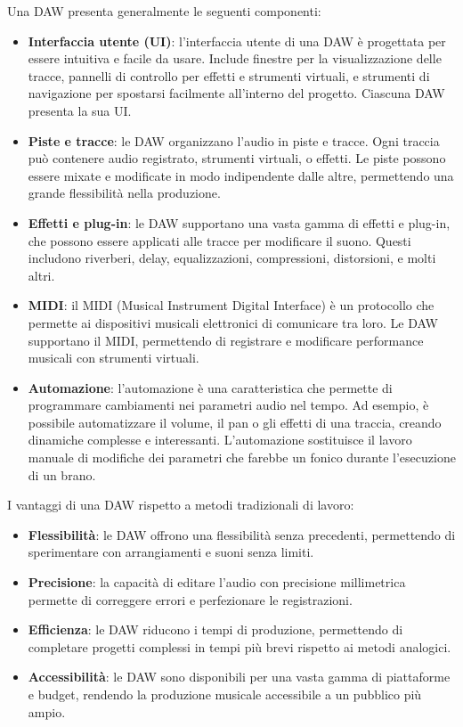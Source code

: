 \documentclass{book}
\begin{document}
Una DAW presenta generalmente le seguenti componenti:

\begin{itemize}
\item \textbf{Interfaccia utente (UI)}: l’interfaccia utente di una DAW è progettata per essere intuitiva e facile da usare. Include finestre per la visualizzazione delle tracce, pannelli di controllo per effetti e strumenti virtuali, e strumenti di navigazione per spostarsi facilmente all’interno del progetto. Ciascuna DAW presenta la sua UI.
\item \textbf{Piste e tracce}: le DAW organizzano l’audio in piste e tracce. Ogni traccia può contenere audio registrato, strumenti virtuali, o effetti. Le piste possono essere mixate e modificate in modo indipendente dalle altre, permettendo una grande flessibilità nella produzione.
\item \textbf{Effetti e plug-in}: le DAW supportano una vasta gamma di effetti e plug-in, che possono essere applicati alle tracce per modificare il suono. Questi includono riverberi, delay, equalizzazioni, compressioni, distorsioni, e molti altri.
\item \textbf{MIDI}: il MIDI (Musical Instrument Digital Interface) è un protocollo che permette ai dispositivi musicali elettronici di comunicare tra loro. Le DAW supportano il MIDI, permettendo di registrare e modificare performance musicali con strumenti virtuali.
\item \textbf{Automazione}: l’automazione è una caratteristica che permette di programmare cambiamenti nei parametri audio nel tempo. Ad esempio, è possibile automatizzare il volume, il pan o gli effetti di una traccia, creando dinamiche complesse e interessanti. L’automazione sostituisce il lavoro manuale di modifiche dei parametri che farebbe un fonico durante l’esecuzione di un brano.
\end{itemize}

I vantaggi di una DAW rispetto a metodi tradizionali di lavoro:

\begin{itemize}
\item \textbf{Flessibilità}: le DAW offrono una flessibilità senza precedenti, permettendo di sperimentare con arrangiamenti e suoni senza limiti.
\item \textbf{Precisione}: la capacità di editare l’audio con precisione millimetrica permette di correggere errori e perfezionare le registrazioni.
\item \textbf{Efficienza}: le DAW riducono i tempi di produzione, permettendo di completare progetti complessi in tempi più brevi rispetto ai metodi analogici.
\item \textbf{Accessibilità}: le DAW sono disponibili per una vasta gamma di piattaforme e budget, rendendo la produzione musicale accessibile a un pubblico più ampio.
\end{itemize}
\end{document}
